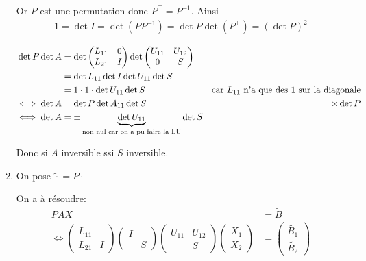 \documentclass{article}
\begin{document}
\begin{enumerate}
    Or $P$ est une permutation donc $P^\top = P^{-1}$.
    Ainsi 
    \begin{align*}
        1 = \det I = \det (P P^{-1}) = \det P \det (P^\top ) = (\det P)^2
    \end{align*}

    \begin{align*}
        \det P \det A &= \det \begin{pmatrix} L_{11} & 0 \\ L_{21} & I \end{pmatrix} \det \begin{pmatrix} U_{11} & U_{12} \\ 0 & S \end{pmatrix}  \\
        &= \det L_{11} \det I \det U_{11} \det S \\
        &= 1  \cdot 1  \cdot \det U_{11} \det S \quad&\text{car $L_{11}$ n'a que des 1 sur la diagonale} \\
    \iff \det A &= \det P \det A_{11} \det S \quad&\text{$ \times \det P$} \\
    \iff \det A &= \pm \underbrace{\det U_{11}}_\text{non nul car on a pu faire la LU} \det S \\
    \end{align*}

    Donc si $A$ inversible ssi $S$ inversible.

\item On pose $\tilde{ \cdot } = P \cdot $

    On a à résoudre:
    \begin{align*}
        PAX &= \tilde{B} \\
        \iff \begin{pmatrix} L_{11} \\ L_{21} & I \end{pmatrix} \begin{pmatrix} I & \\ & S \end{pmatrix}  \begin{pmatrix} U_{11} & U_{12} \\ & S \end{pmatrix} \begin{pmatrix} X_1 \\ X_2 \end{pmatrix} &= \begin{pmatrix} \tilde{B_1} \\ \tilde{B_2} \end{pmatrix}  \\
    \end{align*}


\end{enumerate}
\end{document}
